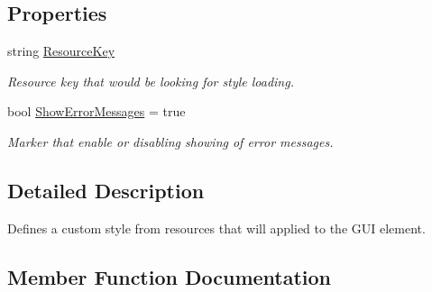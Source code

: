 \subsection*{Properties}
\begin{DoxyCompactItemize}
\item 
string \mbox{\hyperlink{class_wpf_handler_1_1_u_i_1_1_auto_layout_1_1_options_1_1_style_attribute_a25d5446eb9674e30cf46c642734648fa}{Resource\+Key}}
\begin{DoxyCompactList}\small\item\em Resource key that would be looking for style loading. \end{DoxyCompactList}\item 
bool \mbox{\hyperlink{class_wpf_handler_1_1_u_i_1_1_auto_layout_1_1_options_1_1_style_attribute_a86e104f756eca13578f07d3c04832a7a}{Show\+Error\+Messages}} = true
\begin{DoxyCompactList}\small\item\em Marker that enable or disabling showing of error messages. \end{DoxyCompactList}\end{DoxyCompactItemize}


\subsection{Detailed Description}
Defines a custom style from resources that will applied to the G\+UI element. 



\subsection{Member Function Documentation}
\mbox{\label{class_wpf_handler_1_1_u_i_1_1_auto_layout_1_1_options_1_1_style_attribute_a4507ba7b9729b527b0c4f57bffaac0be}} 
